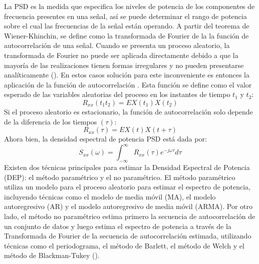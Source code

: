 La PSD es la medida que especifica los niveles de potencia de los componentes de frecuencia presentes en una señal, así se puede determinar el rango de potencia sobre el cual las frecuencias de la señal están operando. A partir del teorema de Wiener-Khinchin, se define como la transformada de Fourier de la la función de autocorrelación de una señal. Cuando se presenta un proceso aleatorio, la transformada de Fourier no puede ser aplicada directamente debido a que la mayoría de las realizaciones tienen formas irregulares y no pueden presentarse analíticamente (\cite{HerreraSepulveda_2017}). En estos casos solución para este inconveniente es entonces la aplicación de la función de autocorrelación . Esta función se define como el valor esperado de las variables aleatorias del proceso en los instantes de tiempo $t_1$ y $t_2$:
\begin{equation}
    R_{xx}(t_1 t_2) = E{X(t_1)X(t_2)}
\end{equation}
Si el proceso aleatorio es estacionario, la función de autocorrelación solo depende de la diferencia de los tiempos $(\tau)$:
\begin{equation}
    R_{xx}(\tau) = E{X(t)X(t+\tau)}
\end{equation}
Ahora bien, la densidad espectral de potencia PSD está dada por:
\begin{equation}
   S_{xx}(\omega) = \int_{-\infty}^{\infty} R_{xx}(\tau) e^{-j\omega\tau} d\tau
\end{equation}
Existen dos técnicas principales para estimar la Densidad Espectral de Potencia (DEP): el método paramétrico y el no paramétrico. El método paramétrico utiliza un modelo para el proceso aleatorio para estimar el espectro de potencia, incluyendo técnicas como el modelo de media móvil (MA), el modelo autoregresivo (AR) y el modelo autoregresivo de media móvil (ARMA). Por otro lado, el método no paramétrico estima primero la secuencia de autocorrelación de un conjunto de datos y luego estima el espectro de potencia a través de la Transformada de Fourier de la secuencia de autocorrelación estimada, utilizando técnicas como el periodograma, el método de Barlett, el método de Welch y el método de Blackman-Tukey (\cite{HerreraSepulveda_2017}).



